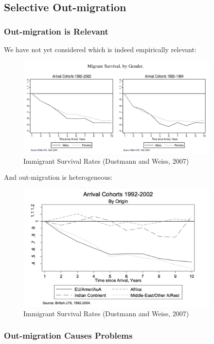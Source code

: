     \subsection{Selective Out-migration}

        \subsubsection{Out-migration is Relevant}

            We have not yet considered  which is indeed empirically relevant:

            \begin{figure}[H]
                \centering
                \includegraphics[width=4in]{images/ch11/11_selective_outmig_2.png}
                \caption{Immigrant Survival Rates (Dustmann and Weiss, 2007)}
            \end{figure}

            And out-migration is heterogeneous:

            \begin{figure}[H]
                \centering
                \includegraphics[width=4in]{images/ch11/11_selective_outmig_3.png}
                \caption{Immigrant Survival Rates (Dustmann and Weiss, 2007)}
            \end{figure}

        \subsubsection{Out-migration Causes Problems}

